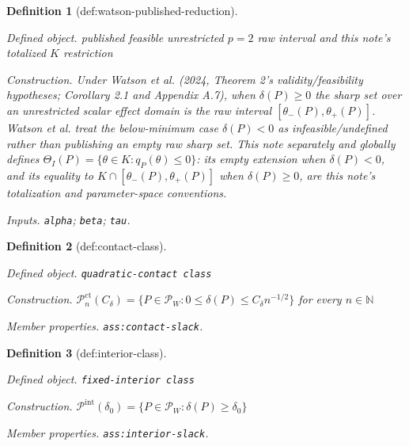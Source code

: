 \documentclass{article}
\newtheorem{definition}{Definition}
\begin{document}
\begin{definition}[def:watson-published-reduction]\label{def:watson-published-reduction}
\par\smallskip\noindent\emph{Defined object.} published feasible unrestricted \(p=2\) raw interval and this note's totalized \(K\) restriction
\par\smallskip\noindent\emph{Construction.} Under Watson et al. (2024, Theorem 2's validity/feasibility hypotheses; Corollary 2.1 and Appendix A.7), when \(\delta(P)\geq0\) the sharp set over an unrestricted scalar effect domain is the raw interval \([\theta_-(P),\theta_+(P)]\). Watson et al. treat the below-minimum case \(\delta(P)<0\) as infeasible/undefined rather than publishing an empty raw sharp set. This note separately and globally defines \(\Theta_I(P)=\{\theta\in K:q_P(\theta)\leq0\}\): its empty extension when \(\delta(P)<0\), and its equality to \(K\cap[\theta_-(P),\theta_+(P)]\) when \(\delta(P)\geq0\), are this note's totalization and parameter-space conventions.
\par\smallskip\noindent\emph{Inputs.} \texttt{alpha}; \texttt{beta}; \texttt{tau}.
\end{definition}

\begin{definition}[def:contact-class]\label{def:contact-class}
\par\smallskip\noindent\emph{Defined object.} \texttt{quadratic-\allowbreak{}contact class}
\par\smallskip\noindent\emph{Construction.} \(\mathcal P_n^{\mathrm{ct}}(C_{\delta})=\{P\in\mathcal P_W:0\leq\delta(P)\leq C_{\delta}n^{-1/2}\}\) for every \(n\in\mathbb N\)
\par\smallskip\noindent\emph{Member properties.} \texttt{ass:\allowbreak{}contact-\allowbreak{}slack}.
\end{definition}

\begin{definition}[def:interior-class]\label{def:interior-class}
\par\smallskip\noindent\emph{Defined object.} \texttt{fixed-\allowbreak{}interior class}
\par\smallskip\noindent\emph{Construction.} \(\mathcal P^{\mathrm{int}}(\delta_0)=\{P\in\mathcal P_W:\delta(P)\geq\delta_0\}\)
\par\smallskip\noindent\emph{Member properties.} \texttt{ass:\allowbreak{}interior-\allowbreak{}slack}.
\end{definition}
\end{document}
